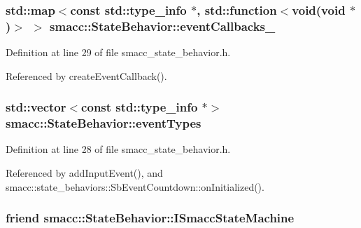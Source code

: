 \subsubsection[{\texorpdfstring{event\+Callbacks\+\_\+}{eventCallbacks_}}]{\setlength{\rightskip}{0pt plus 5cm}std\+::map$<$const std\+::type\+\_\+info $\ast$, std\+::function$<$void(void $\ast$)$>$ $>$ smacc\+::\+State\+Behavior\+::event\+Callbacks\+\_\+}\hypertarget{classsmacc_1_1StateBehavior_acbe54c0be9466094565c5b47ab53d84b}{}\label{classsmacc_1_1StateBehavior_acbe54c0be9466094565c5b47ab53d84b}


Definition at line 29 of file smacc\+\_\+state\+\_\+behavior.\+h.



Referenced by create\+Event\+Callback().

\subsubsection[{\texorpdfstring{event\+Types}{eventTypes}}]{\setlength{\rightskip}{0pt plus 5cm}std\+::vector$<$const std\+::type\+\_\+info $\ast$$>$ smacc\+::\+State\+Behavior\+::event\+Types}\hypertarget{classsmacc_1_1StateBehavior_a2df8158ebc3bb0f82c55824f088288bb}{}\label{classsmacc_1_1StateBehavior_a2df8158ebc3bb0f82c55824f088288bb}


Definition at line 28 of file smacc\+\_\+state\+\_\+behavior.\+h.



Referenced by add\+Input\+Event(), and smacc\+::state\+\_\+behaviors\+::\+Sb\+Event\+Countdown\+::on\+Initialized().

\subsubsection[{\texorpdfstring{I\+Smacc\+State\+Machine}{ISmaccStateMachine}}]{\setlength{\rightskip}{0pt plus 5cm}friend smacc\+::\+State\+Behavior\+::\+I\+Smacc\+State\+Machine\hspace{0.3cm}{\ttfamily [private]}}\hypertarget{classsmacc_1_1StateBehavior_a4bc03d3369b90283c91d7046461a554a}{}\label{classsmacc_1_1StateBehavior_a4bc03d3369b90283c91d7046461a554a}


